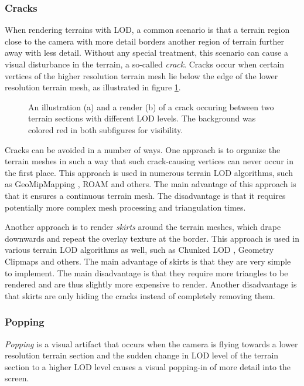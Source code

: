 \subsubsection{Cracks}
When rendering terrains with LOD, a common scenario is 
that a terrain region close to the camera with more detail
borders another region of terrain further away with less detail.
Without any special treatment, this scenario can cause a visual disturbance in the terrain,
a so-called \textit{crack}. Cracks occur when certain vertices of the higher resolution terrain mesh 
lie below the edge of the lower resolution terrain mesh, as illustrated in figure \ref{fig:crack-example}.

\begin{figure}[H]
  \centering
  \qquad
  \caption{An illustration (a) and a render (b) of a crack occuring between two terrain sections with different LOD levels. The background was colored red in both subfigures for visibility.}\label{fig:crack-example}
\end{figure}

Cracks can be avoided in a number of ways. 
One approach is to organize the terrain meshes in such a 
way that such crack-causing vertices can never occur in the first place.
This approach is used in numerous terrain LOD algorithms, 
such as GeoMipMapping \cite{geomipmapping}, ROAM \cite{roam} and others.
The main advantage of this approach is that it ensures
a continuous terrain mesh. The disadvantage is 
that it requires potentially more complex mesh processing and 
triangulation times.

Another approach is to render \textit{skirts}
around the terrain meshes, which drape downwards 
and repeat the overlay texture at the border. 
This approach is used in various 
terrain LOD algorithms as well, such as 
Chunked LOD \cite{chunkedlod}, Geometry Clipmaps \cite{geomclipmaps}
and others. The main advantage of skirts is that they 
are very simple to implement.
The main disadvantage is that they require more triangles 
to be rendered and are thus slightly more expensive to render. Another disadvantage
is that skirts are only hiding 
the cracks instead of completely removing them.

\subsubsection{Popping}
\textit{Popping} is a visual artifact 
that occurs when the camera is flying towards 
a lower resolution terrain section and 
the sudden change in LOD level of the terrain section 
to a higher LOD level causes a visual popping-in of more detail
into the screen.

